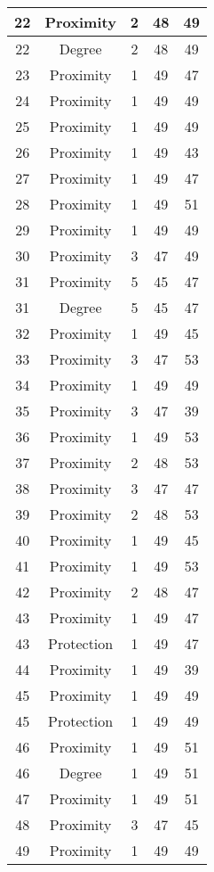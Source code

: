 \documentclass[results.tex]{subfiles}
\begin{document}
\begin{center}
\begin{tabular}{| c || c | c | c | c |}
    \hline
    22 & Proximity & 2 & 48 & 49 \\ 
    \hline
    22 & Degree & 2 & 48 & 49 \\ 
    \hline
    23 & Proximity & 1 & 49 & 47 \\ 
    \hline
    24 & Proximity & 1 & 49 & 49 \\ 
    \hline
    25 & Proximity & 1 & 49 & 49 \\ 
    \hline
    26 & Proximity & 1 & 49 & 43 \\ 
    \hline
    27 & Proximity & 1 & 49 & 47 \\ 
    \hline
    28 & Proximity & 1 & 49 & 51 \\ 
    \hline
    29 & Proximity & 1 & 49 & 49 \\ 
    \hline
    30 & Proximity & 3 & 47 & 49 \\ 
    \hline
    31 & Proximity & 5 & 45 & 47 \\ 
    \hline
    31 & Degree & 5 & 45 & 47 \\ 
    \hline
    32 & Proximity & 1 & 49 & 45 \\ 
    \hline
    33 & Proximity & 3 & 47 & 53 \\ 
    \hline
    34 & Proximity & 1 & 49 & 49 \\ 
    \hline
    35 & Proximity & 3 & 47 & 39 \\ 
    \hline
    36 & Proximity & 1 & 49 & 53 \\ 
    \hline
    37 & Proximity & 2 & 48 & 53 \\ 
    \hline
    38 & Proximity & 3 & 47 & 47 \\ 
    \hline
    39 & Proximity & 2 & 48 & 53 \\ 
    \hline
    40 & Proximity & 1 & 49 & 45 \\ 
    \hline
    41 & Proximity & 1 & 49 & 53 \\ 
    \hline
    42 & Proximity & 2 & 48 & 47 \\ 
    \hline
    43 & Proximity & 1 & 49 & 47 \\ 
    \hline
    43 & Protection & 1 & 49 & 47 \\ 
    \hline
    44 & Proximity & 1 & 49 & 39 \\ 
    \hline
    45 & Proximity & 1 & 49 & 49 \\ 
    \hline
    45 & Protection & 1 & 49 & 49 \\ 
    \hline
    46 & Proximity & 1 & 49 & 51 \\ 
    \hline
    46 & Degree & 1 & 49 & 51 \\ 
    \hline
    47 & Proximity & 1 & 49 & 51 \\ 
    \hline
    48 & Proximity & 3 & 47 & 45 \\ 
    \hline
    49 & Proximity & 1 & 49 & 49 \\ 
    \hline   \end{tabular}
\end{center}
\end{document}
